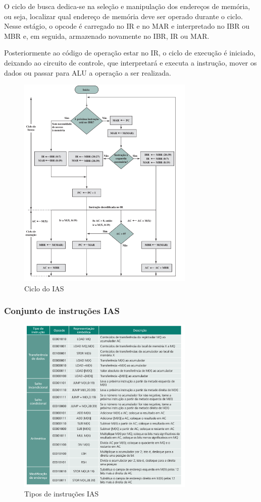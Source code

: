 \documentclass{article}
\begin{document}
O ciclo de busca dedica-se na seleção e manipulação dos endereços de memória,
ou seja, localizar qual endereço de memória deve ser operado durante o ciclo.
Nesse estágio, o opcode é carregado no IR e no MAR e interpretado no IBR ou MBR
e, em seguida, armazenado novamente no IBR, IR ou MAR.

Posteriormente ao código de operação estar no IR, o ciclo de execução é
iniciado, deixando ao circuito de controle, que interpretará e executa a
instrução, mover os dados ou passar para ALU a operação a ser realizada.

\begin{figure}[H]
	\centering
	\includegraphics[width=0.75\textwidth]{cicloDoIAS.png}
	\caption{Ciclo do IAS}
\end{figure}

\subsubsection{Conjunto de instruções IAS}
\begin{figure}[H]
	\centering
	\includegraphics[width=0.75\textwidth]{tiposDeInstrução.png}
	\caption{Tipos de instruções IAS}
\end{figure}
\end{document}
